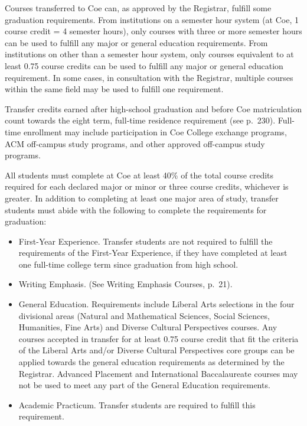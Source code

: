 \documentclass[
  letterpaper,
]{scrbook}
\providecommand{\tightlist}{%
  \setlength{\itemsep}{0pt}\setlength{\parskip}{0pt}}
\begin{document}
Courses transferred to Coe can, as approved by the Registrar, fulfill
some graduation requirements. From institutions on a semester hour
system (at Coe, 1 course credit = 4 semester hours), only courses with
three or more semester hours can be used to fulfill any major or general
education requirements. From institutions on other than a semester hour
system, only courses equivalent to at least 0.75 course credits can be
used to fulfill any major or general education requirement. In some
cases, in consultation with the Registrar, multiple courses within the
same field may be used to fulfill one requirement.

Transfer credits earned after high-school graduation and before Coe
matriculation count towards the eight term, full-time residence
requirement (see p.~230). Full-time enrollment may include participation
in Coe College exchange programs, ACM off-campus study programs, and
other approved off-campus study programs.

All students must complete at Coe at least 40\% of the total course
credits required for each declared major or minor or three course
credits, whichever is greater. In addition to completing at least one
major area of study, transfer students must abide with the following to
complete the requirements for graduation:

\begin{itemize}
\tightlist
\item
  First-Year Experience. Transfer students are not required to fulfill
  the requirements of the First-Year Experience, if they have completed
  at least one full-time college term since graduation from high school.
\item
  Writing Emphasis. (See Writing Emphasis Courses, p.~21).
\item
  General Education. Requirements include Liberal Arts selections in the
  four divisional areas (Natural and Mathematical Sciences, Social
  Sciences, Humanities, Fine Arts) and Diverse Cultural Perspectives
  courses. Any courses accepted in transfer for at least 0.75 course
  credit that fit the criteria of the Liberal Arts and/or Diverse
  Cultural Perspectives core groups can be applied towards the general
  education requirements as determined by the Registrar. Advanced
  Placement and International Baccalaureate courses may not be used to
  meet any part of the General Education requirements.
\item
  Academic Practicum. Transfer students are required to fulfill this
  requirement.
\end{itemize}
\end{document}
